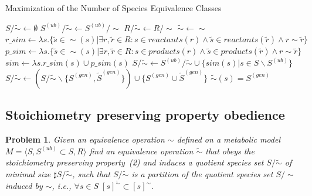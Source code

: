 \documentclass[10pt]{bmc_article}
\newenvironment{bmcformat}{\baselineskip20pt\sloppy\setboolean{publ}{false}}{\baselineskip20pt\sloppy}
\begin{document}
\begin{bmcformat}
\begin{algorithm}[H]
\SetAlgoVlined
{}
\caption{Maximization of the Number of Species Equivalence Classes}
\BlankLine
\BlankLine
$S/\tilde{\sim} \leftarrow \emptyset$ 
$S^{(ub)}/\tilde{\sim} \leftarrow S^{(ub)}/\sim$ 
$R/\tilde{\sim} \leftarrow R/\sim$ 
$\tilde{\sim} \leftarrow \sim$ 
\BlankLine
\BlankLine
{}
\BlankLine
{}
$r\_sim \leftarrow \lambda{s}.\{\tilde{s}\in\sim(s)|\exists r,\tilde{r}\in{R}: s\in reactants(r) \land \tilde{s}\in reactants(\tilde{r}) \land r \sim \tilde{r}\}$ \;
$p\_sim \leftarrow \lambda{s}.\{\tilde{s}\in\sim(s)|\exists r,\tilde{r}\in{R}: s\in products(r) \land \tilde{s}\in products(\tilde{r}) \land r \sim \tilde{r}\}$ \;
$sim \leftarrow \lambda{s}.r\_sim(s)\cup p\_sim(s)$ \;
\BlankLine
$S/\tilde{\sim} \leftarrow S^{(ub)}/\tilde{\sim} \cup \{sim(s)|s \in S\backslash S^{(ub)}\}$ \;
\BlankLine
{}
 {
	$S/\tilde{\sim} \leftarrow (S/\tilde{\sim}\backslash{\{S^{(gen)}, \tilde{S}^{(gen)}\}})\cup\{S^{(gen)}\cup \tilde{S}^{(gen)}\}$ \;
}
\BlankLine
{}
 {
	 {
		$\tilde{\sim}(s) = S^{(gen)}$ \;
	}
}
\BlankLine
{}
\end{algorithm} 

\subsection*{Stoichiometry preserving property obedience}
\newtheorem{p2}[pbm]{Problem}
\begin{p2}
Given an equivalence operation $\sim$ defined on a metabolic model $M=\langle S, S^{(ub)}\subset{S}, R \rangle$ find an equivalence operation $\tilde{\sim}$ that obeys the stoichiometry preserving property~(2) and induces a quotient species set $S/\tilde{\sim}$ of minimal size $\sharp S/\tilde{\sim}$, such that $S/\tilde{\sim}$ is a partition of the quotient species set $S/\sim$ induced by $\sim$, i.e., $\forall s \in S \; [s]^{\tilde{\sim}} \subset [s]^{\sim} $. 
\end{p2}

\end{bmcformat}
\end{document}
